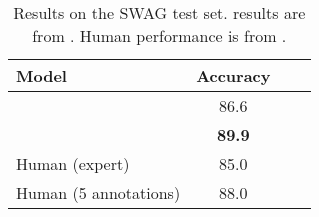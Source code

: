 \begin{table}[t]
\begin{center}
\begin{tabular}{lccc}
\toprule
\bf Model & \bf Accuracy \\
\midrule
\bertlarge{} &  86.6 \\
\ourmodel{} & \bf{89.9}\\
\midrule
Human (expert) & 85.0\\
Human (5 annotations) & 88.0 \\
\bottomrule
\end{tabular}
\end{center}
\caption{Results on the SWAG test set. \bertlarge{} results are from . Human performance is from .}
\label{tab:roberta_swag}
\end{table}